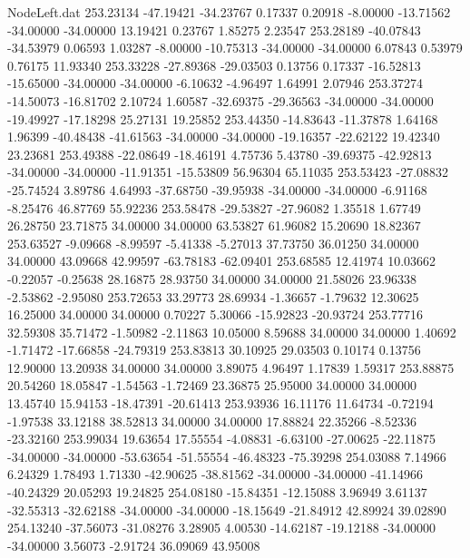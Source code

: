 \begin{filecontents}{NodeLeft.dat}
 253.23134  -47.19421  -34.23767     0.17337    0.20918   -8.00000  -13.71562  -34.00000  -34.00000   13.19421    0.23767    1.85275    2.23547
 253.28189  -40.07843  -34.53979     0.06593    1.03287   -8.00000  -10.75313  -34.00000  -34.00000    6.07843    0.53979    0.76175   11.93340
 253.33228  -27.89368  -29.03503     0.13756    0.17337  -16.52813  -15.65000  -34.00000  -34.00000   -6.10632   -4.96497    1.64991    2.07946
 253.37274  -14.50073  -16.81702     2.10724    1.60587  -32.69375  -29.36563  -34.00000  -34.00000  -19.49927  -17.18298   25.27131   19.25852
 253.44350  -14.83643  -11.37878     1.64168    1.96399  -40.48438  -41.61563  -34.00000  -34.00000  -19.16357  -22.62122   19.42340   23.23681
 253.49388  -22.08649  -18.46191     4.75736    5.43780  -39.69375  -42.92813  -34.00000  -34.00000  -11.91351  -15.53809   56.96304   65.11035
 253.53423  -27.08832  -25.74524     3.89786    4.64993  -37.68750  -39.95938  -34.00000  -34.00000   -6.91168   -8.25476   46.87769   55.92236
 253.58478  -29.53827  -27.96082     1.35518    1.67749   26.28750   23.71875   34.00000   34.00000   63.53827   61.96082   15.20690   18.82367
 253.63527   -9.09668   -8.99597    -5.41338   -5.27013   37.73750   36.01250   34.00000   34.00000   43.09668   42.99597  -63.78183  -62.09401
 253.68585   12.41974   10.03662    -0.22057   -0.25638   28.16875   28.93750   34.00000   34.00000   21.58026   23.96338   -2.53862   -2.95080
 253.72653   33.29773   28.69934    -1.36657   -1.79632   12.30625   16.25000   34.00000   34.00000    0.70227    5.30066  -15.92823  -20.93724
 253.77716   32.59308   35.71472    -1.50982   -2.11863   10.05000    8.59688   34.00000   34.00000    1.40692   -1.71472  -17.66858  -24.79319
 253.83813   30.10925   29.03503     0.10174    0.13756   12.90000   13.20938   34.00000   34.00000    3.89075    4.96497    1.17839    1.59317
 253.88875   20.54260   18.05847    -1.54563   -1.72469   23.36875   25.95000   34.00000   34.00000   13.45740   15.94153  -18.47391  -20.61413
 253.93936   16.11176   11.64734    -0.72194   -1.97538   33.12188   38.52813   34.00000   34.00000   17.88824   22.35266   -8.52336  -23.32160
 253.99034   19.63654   17.55554    -4.08831   -6.63100  -27.00625  -22.11875  -34.00000  -34.00000  -53.63654  -51.55554  -46.48323  -75.39298
 254.03088    7.14966    6.24329     1.78493    1.71330  -42.90625  -38.81562  -34.00000  -34.00000  -41.14966  -40.24329   20.05293   19.24825
 254.08180  -15.84351  -12.15088     3.96949    3.61137  -32.55313  -32.62188  -34.00000  -34.00000  -18.15649  -21.84912   42.89924   39.02890
 254.13240  -37.56073  -31.08276     3.28905    4.00530  -14.62187  -19.12188  -34.00000  -34.00000    3.56073   -2.91724   36.09069   43.95008

\end{filecontents}

